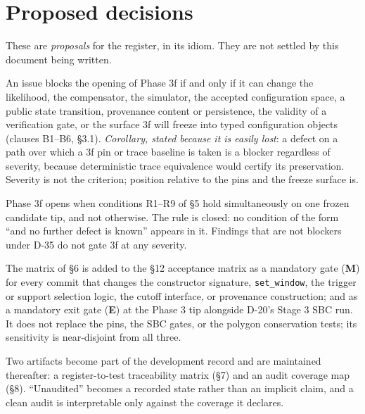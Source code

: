 \documentclass[11pt]{article}
\renewcommand{\tt}[1]{\texttt{#1}}
\newenvironment{ruling}{\begin{leftbar}\small}{\end{leftbar}}
\begin{document}
\section{Proposed decisions}

\begin{ruling}
\noindent These are \emph{proposals} for the register, in its idiom. They are not settled
by this document being written.
\end{ruling}

\begin{description}[leftmargin=3.6em,style=nextline,font=\normalfont\bfseries]

\item[D-35 --- The 3f blocker test] An issue blocks the opening of Phase 3f if and only if
it can change the likelihood, the compensator, the simulator, the accepted configuration
space, a public state transition, provenance content or persistence, the validity of a
verification gate, or the surface 3f will freeze into typed configuration objects (clauses
B1--B6, \S3.1). \emph{Corollary, stated because it is easily lost}: a defect on a path over
which a 3f pin or trace baseline is taken is a blocker regardless of severity, because
deterministic trace equivalence would certify its preservation. Severity is not the
criterion; position relative to the pins and the freeze surface is.

\item[D-36 --- Finite readiness rule] Phase 3f opens when conditions R1--R9 of \S5 hold
simultaneously on one frozen candidate tip, and not otherwise. The rule is closed: no
condition of the form ``and no further defect is known'' appears in it. Findings that are
not blockers under D-35 do not gate 3f at any severity.

\item[D-37 --- Compatibility and state-transition matrix as a standing gate] The matrix of
\S6 is added to the \S12 acceptance matrix as a mandatory gate (\textbf{M}) for every
commit that changes the constructor signature, \tt{set\_window}, the trigger or support
selection logic, the cutoff interface, or provenance construction; and as a mandatory
exit gate (\textbf{E}) at the Phase 3 tip alongside D-20's Stage 3 SBC run. It does not
replace the pins, the SBC gates, or the polygon conservation tests; its sensitivity is
near-disjoint from all three.

\item[D-38 --- Coverage is recorded, absence of findings is not evidence] Two artifacts
become part of the development record and are maintained thereafter: a register-to-test
traceability matrix (\S7) and an audit coverage map (\S8). ``Unaudited'' becomes a
recorded state rather than an implicit claim, and a clean audit is interpretable only
against the coverage it declares.

\end{description}
\end{document}
